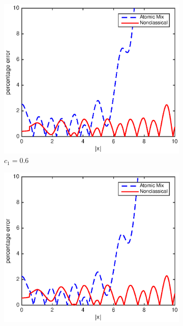 \documentclass[12pt]{article}
\begin{document}
{\begin{figure}[p]
    \centering
    \begin{subfigure}{0.495\textwidth}
        \centering
        \includegraphics[width=\textwidth]{NSE_err_C60.eps}
        \caption{$c_1 = 0.6$}
        \label{figerrC60}
    \end{subfigure}
    \hfill
    \begin{subfigure}{0.495\textwidth}
        \centering
        \includegraphics[width=\textwidth]{NSE_err_C70.eps}

\end{subfigure}
\end{figure}}
\end{document}
